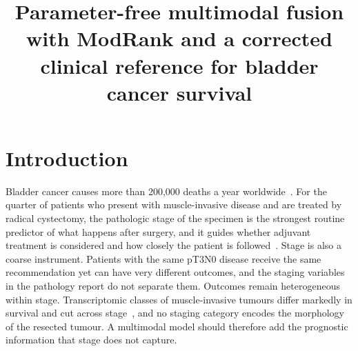 \documentclass[pdflatex,sn-nature]{sn-jnl}
\begin{document}
\title{Parameter-free multimodal fusion with ModRank and a corrected clinical reference for bladder cancer survival}

\author*[1]{ }


\maketitle
\linenumbers

\section*{Introduction}

Bladder cancer causes more than 200,000 deaths a year worldwide~\citep{bray2024globocan}. For the
quarter of patients who present with muscle-invasive disease and are treated by radical cystectomy,
the pathologic stage of the specimen is the strongest routine predictor of what happens after
surgery, and it guides whether adjuvant treatment is considered and how closely the patient is
followed~\citep{witjes2021eau}. Stage is also a coarse instrument. Patients with the same pT3N0
disease receive the same recommendation yet can have very different outcomes, and the staging
variables in the pathology report do not separate them. Outcomes remain heterogeneous within stage.
Transcriptomic classes of muscle-invasive tumours differ markedly in survival and cut across
stage~\citep{kamoun2020consensus, robertson2017blca}, and no staging category encodes the morphology
of the resected tumour. A multimodal model should therefore add the prognostic information that stage
does not capture.
\end{document}

